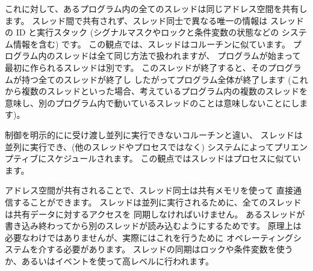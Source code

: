 これに対して、あるプログラム内の全てのスレッドは同じアドレス空間を共有します。
スレッド間で共有されず、スレッド同士で異なる唯一の情報は
スレッドの ID と実行スタック (シグナルマスクやロックと条件変数の状態などの
システム情報を含む) です。
この観点では、スレッドはコルーチンに似ています。
プログラム内のスレッドは全て同じ方法で扱われますが、
プログラムが始まって最初に作られるスレッドは別です。
このスレッドが終了すると、そのプログラムが持つ全てのスレッドが終了し
したがってプログラム全体が終了します
(これから複数のスレッドといった場合、考えているプログラム内の複数のスレッドを
意味し、別のプログラム内で動いているスレッドのことは意味しないことにします)。

制御を明示的にに受け渡し並列に実行できないコルーチンと違い、
スレッドは並列に実行でき、(他のスレッドやプロセスではなく)
システムによってプリエンプティブにスケジュールされます。
この観点ではスレッドはプロセスに似ています。

アドレス空間が共有されることで、スレッド同士は共有メモリを使って
直接通信することができます。
スレッドは並列に実行されるために、全てのスレッドは共有データに対するアクセスを
同期しなければいけません。
あるスレッドが書き込み終わってから別のスレッドが読み込むようにするためです。
原理上は必要なわけではありませんが、実際にはこれを行うために
オペレーティングシステムを介する必要があります。
スレッドの同期はロックや条件変数を使うか、あるいはイベントを使って高レベルに行われます。

